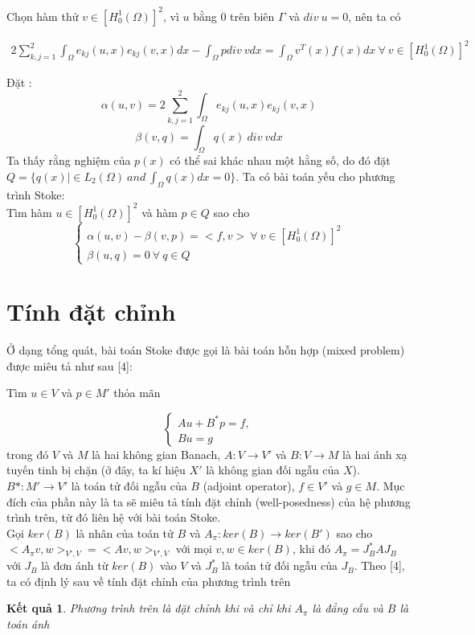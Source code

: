 \documentclass[14pt]{extreport}
\newtheorem{theorem}{\MakeUppercase{K}ết quả}[section]
\begin{document}
{Chọn hàm thử $v \in [ H_0^1(\Omega) ]^2$, vì $u$ bằng 0 trên biên $\Gamma$ và $div \ u = 0$, nên ta có

\begin{equation} \label{eq8}
\begin{split}
2 \sum_{k,j = 1}^2 \int_{\Omega} e_{kj}(u,x) e_{kj} (v,x) dx - \int_{\Omega} p div \ v dx = \int_{\Omega} v^T(x) f(x) dx \ \forall \ v \in [ H_0^1(\Omega) ]^2
\end{split}
\end{equation}

Đặt :
$$\alpha(u, v) = 2 \sum_{k,j = 1}^2 \int_{\Omega} e_{kj}(u,x) e_{kj} (v,x)$$
$$\beta(v, q) = \int_{\Omega} q(x) \ div \ v dx$$
Ta thấy rằng nghiệm của $p(x)$ có thể sai khác nhau một hằng số, do đó đặt $Q = \{q(x) |\in L_2(\Omega) \ and \ \int_{\Omega} q(x) dx = 0 \}$. Ta có bài toán yếu cho phương trình Stoke: \\
Tìm hàm $u \in  [ H_0^1(\Omega) ]^2$ và hàm $p \in Q$ sao cho
$$
\begin{cases}
\alpha(u,v) - \beta(v, p) = <f, v> \ \forall \ v \in [ H_0^1(\Omega) ]^2 \\
\beta(u, q) = 0 \ \forall \ q \in Q
\end{cases}
$$

\section{Tính đặt chỉnh}
Ở dạng tổng quát, bài toán Stoke được gọi là bài toán hỗn hợp (mixed problem) được miêu tả như sau [4]:
\begin{center}
Tìm $u \in V$  và $p \in M'$  thỏa mãn
\end{center}
$$
\begin{cases}
Au + B^*p = f, \\
Bu = g
\end{cases}
$$
trong đó $V$ và $M$ là hai không gian Banach, $A: V \rightarrow V'$ và $B: V \rightarrow M$ là hai ánh xạ tuyến tinh bị chặn (ở đây, ta kí hiệu $X'$ là không gian đối ngẫu của $X$). $B*: M' \rightarrow V'$ là toán tử đối ngẫu của $B$ (adjoint operator), $f \in V'$ và $g \in M$. Mục đích của phần này là ta sẽ miêu tả tính đặt chỉnh (well-posedness) của hệ phương trình trên, từ đó liên hệ với bài toán Stoke. \\

Gọi $ker(B)$ là nhân của toán tử $B$ và $A_{\pi}: ker(B) \rightarrow ker(B')$ sao cho $<A_{\pi}v, w>_{V', V} = <Av, w>_{V', V}$ với mọi $v, w \in ker(B)$, khi đó $A_{\pi} = J_B^*AJ_B$ với $J_B$ là đơn ánh từ $ker(B)$ vào $V$ và $J_B^*$ là toán tử đối ngẫu của $J_B$. Theo [4], ta có định lý sau về tính đặt chỉnh của phương trình trên
\begin{theorem}
Phương trình trên là đặt chỉnh khi và chỉ khi $A_{\pi}$ là đẳng cấu và $B$ là toán ánh
\end{theorem}

}
\end{document}
